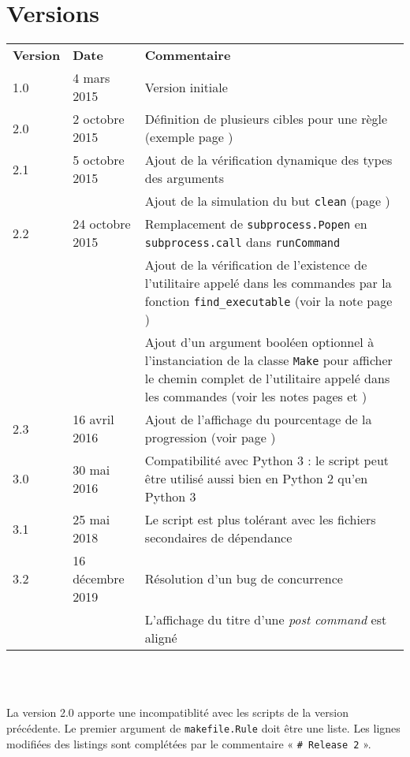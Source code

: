 \documentclass[a4paper,11pt]{extarticle}
\begin{document}
\section{Versions}
  \begin{tabular}{llp{10.5cm}}
    \textbf{Version} & \textbf{Date} & \textbf{Commentaire}\\
    1.0 & 4 mars 2015 & Version initiale \\
    2.0 & 2 octobre 2015 & Définition de plusieurs cibles pour une règle (exemple page \pageref{plusieursCibles})\\
    2.1 & 5 octobre 2015 & Ajout de la vérification dynamique des types des arguments\\
        &                & Ajout de la simulation du but \texttt{clean} (page \pageref{simulationButClean})\\
    2.2 & 24 octobre 2015 & Remplacement de \texttt{subprocess.Popen} en \texttt{subprocess.call} dans \texttt{runCommand}\\
        &                & Ajout de la vérification de l'existence de l'utilitaire appelé dans les commandes par la fonction \texttt{find\_executable} (voir la note page \pageref{verifUtilitaire})\\
        &                & Ajout d'un argument booléen optionnel à l'instanciation de la classe \texttt{Make} pour afficher le chemin complet de l'utilitaire appelé dans les commandes (voir les notes pages \pageref{logUtilityToolPath} et \pageref{logUtilityToolPath2})\\
    2.3 & 16 avril 2016 & Ajout de l'affichage du pourcentage de la progression (voir page \pageref{affichagePourcentage})\\
    3.0 & 30 mai 2016 & Compatibilité avec Python 3 : le script peut être utilisé aussi bien en Python 2 qu'en Python 3\\
    3.1 & 25 mai 2018 & Le script est plus tolérant avec les fichiers secondaires de dépendance\\
    3.2 & 16 décembre 2019 & Résolution d'un bug de concurrence\\
        &                  & L'affichage du titre d'une \emph{post command} est aligné\\
  \end{tabular}
\\~


La version 2.0 apporte une incompatiblité avec les scripts de la version précédente. Le premier argument de \texttt{makefile.Rule} doit être une liste. Les lignes modifiées des listings sont complétées par le commentaire « \texttt{\# Release 2} ».
\end{document}
